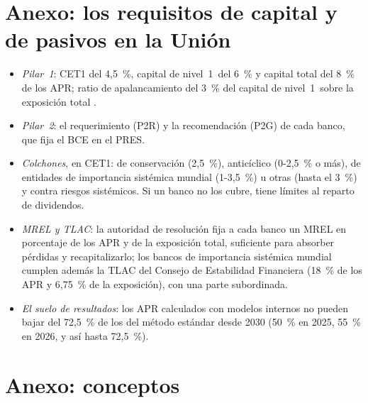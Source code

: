 \documentclass[11pt]{article}
\begin{document}
\section{Anexo: los requisitos de capital\cortetitulo{} y de pasivos en la Unión}\label{anexo:requisitos}

\begin{itemize}
\item \emph{Pilar~1}: CET1 del 4,5~\%, capital de nivel~1~del 6~\% y capital total del 8~\% de los APR; ratio de apalancamiento del 3~\% del capital de nivel~1~sobre la exposición total .
\item \emph{Pilar~2}: el requerimiento (P2R) y la recomendación (P2G) de cada banco, que fija el BCE en el PRES.
\item \emph{Colchones}, en CET1: de conservación (2,5~\%), anticíclico (0-2,5~\% o más), de entidades de importancia sistémica mundial (1-3,5~\%) u otras (hasta el 3~\%) y contra riesgos sistémicos. Si un banco no los cubre, tiene límites al reparto de dividendos.
\item \emph{MREL y TLAC}: la autoridad de resolución fija a cada banco un MREL en porcentaje de los APR y de la exposición total, suficiente para absorber pérdidas y recapitalizarlo; los bancos de importancia sistémica mundial cumplen además la TLAC del Consejo de Estabilidad Financiera (18~\% de los APR y 6,75~\% de la exposición), con una parte subordinada.
\item \emph{El suelo de resultados}: los APR calculados con modelos internos no pueden bajar del 72,5~\% de los del método estándar desde 2030 (50~\% en 2025, 55~\% en 2026, y así hasta 72,5~\%)\nocite{RegUE2024CRR3}.
\end{itemize}

\section{Anexo: conceptos}\label{anexo:conceptos}
\end{document}
